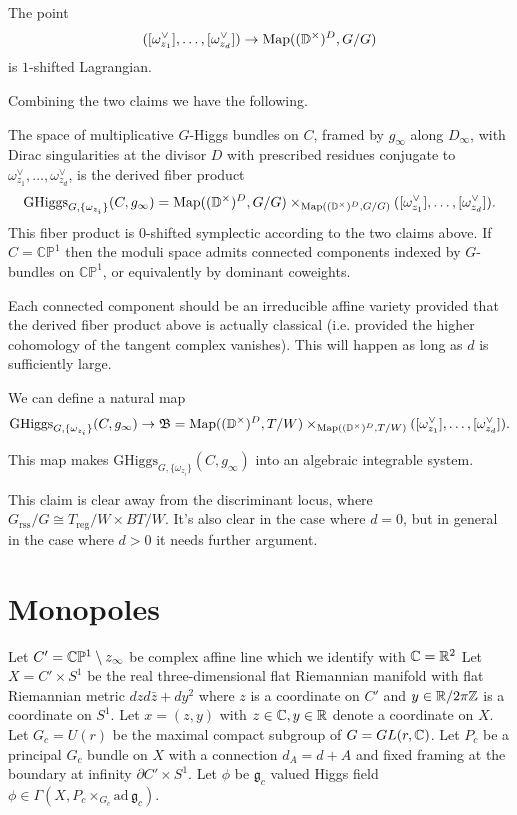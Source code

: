 \documentclass[12pt,psamsfonts,reqno]{amsart}
\begin{document}
\begin{claim}
The point 
\[([\omega_{z_1}^\vee], \ldots, [\omega_{z_d}^\vee]) \to \operatorname{Map}((\mathbb{D}^\times)^D, G/G)\]
is $1$-shifted Lagrangian.
\end{claim}

Combining the two claims we have the following.

\begin{definition}
The space of multiplicative $G$-Higgs bundles on $C$, framed by $g_\infty$ along $D_\infty$, with Dirac singularities at the divisor $D$ with prescribed residues conjugate to $\omega_{z_1}^\vee, \ldots, \omega_{z_d}^\vee$, is the derived fiber product
\[\mathrm{GHiggs}_{G, \{\omega_{z_i}\}}(C, g_\infty) =  \operatorname{Map}((\mathbb{D}^\times)^D, G/G) \times_{\operatorname{Map}((\mathbb{D}^\times)^D, G/G)} ([\omega_{z_1}^\vee], \ldots, [\omega_{z_d}^\vee]).\]
This fiber product is 0-shifted symplectic according to the two claims above.  If $C = \mathbb{CP}^1$ then the moduli space admits connected components indexed by $G$-bundles on $\mathbb{CP}^1$, or equivalently by dominant coweights.
\end{definition}

Each connected component should be an irreducible affine variety provided that the derived fiber product above is actually classical (i.e. provided the higher cohomology of the tangent complex vanishes).  This will happen as long as $d$ is sufficiently large.

We can define a natural map
\[\mathrm{GHiggs}_{G, \{\omega_{z_i}\}}(C, g_\infty) \to \mathfrak{B} =  \operatorname{Map}((\mathbb{D}^\times)^D, T/W) \times_{\operatorname{Map}((\mathbb{D}^\times)^D, T/W)} ([\omega_{z_1}^\vee], \ldots, [\omega_{z_d}^\vee]).\]

\begin{claim}
This map makes $\mathrm{GHiggs}_{G, \{\omega_{z_i}\}}(C, g_\infty)$ into an algebraic integrable system.
\end{claim}

This claim is clear away from the discriminant locus, where $G_{\mathrm{rss}}/G \cong T_{\mathrm{reg}}/W \times BT/W$.  It's also clear in the case where $d=0$, but in general in the case where $d > 0$ it needs further argument.

\section{Monopoles}


 Let $C' = \mathbb C \mathbb P^1 \setminus z_{\infty}$ be complex affine line which
  we identify with $\mathbb C = \mathbb R^2$
 Let $X  = C' \times S^1$
  be the real three-dimensional  flat Riemannian manifold  with flat Riemannian metric $ dz d \bar z + dy^2$ where $z$ is a coordinate
  on $C'$ and $y \in \mathbb R/ 2 \pi \mathbb Z$ is a coordinate on $S^1$. Let $x = (z, y)$ with $z \in \mathbb C, y \in \mathbb R$
  denote a coordinate on $X$. 
 Let $G_c = U(r)$ be the maximal compact subgroup
  of $G =GL(r, \mathbb C)$. Let $P_c$ be a principal $G_c$ bundle on $X$ with a connection $d_{A} = d + A$
  and fixed framing at the boundary at infinity $ \partial C' \times S^1$. 
  Let $\phi$ be $\mathfrak{g}_{c}$  valued Higgs field $\phi \in \Gamma(X, P_c \times_{G_c} \mathrm{ad}\, \mathfrak{g}_c)
$. 
\end{document}
